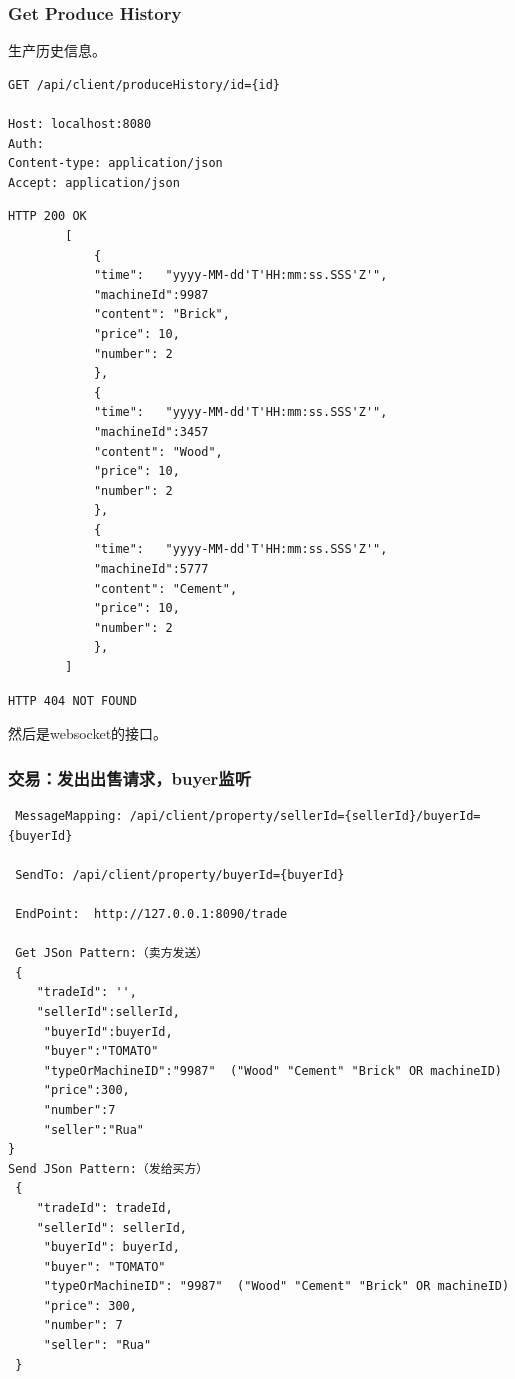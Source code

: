 \documentclass[12pt, a4paper,UTF8]{article}
\begin{document}
				\subsubsection{Get Produce History}
					生产历史信息。
\begin{lstlisting}
GET /api/client/produceHistory/id={id}

Host: localhost:8080
Auth:
Content-type: application/json
Accept: application/json
\end{lstlisting}
\begin{lstlisting}
HTTP 200 OK
        [
            {
            "time":   "yyyy-MM-dd'T'HH:mm:ss.SSS'Z'",
            "machineId":9987
            "content": "Brick",
            "price": 10,
            "number": 2
            },
            {
            "time":   "yyyy-MM-dd'T'HH:mm:ss.SSS'Z'",
            "machineId":3457
            "content": "Wood",
            "price": 10,
            "number": 2
            },
            {
            "time":   "yyyy-MM-dd'T'HH:mm:ss.SSS'Z'",
            "machineId":5777
            "content": "Cement",
            "price": 10,
            "number": 2
            },
        ]\end{lstlisting}
\begin{lstlisting}
HTTP 404 NOT FOUND
\end{lstlisting}

		然后是websocket的接口。

				\subsubsection{交易：发出出售请求，buyer监听}
\begin{lstlisting}
 MessageMapping: /api/client/property/sellerId={sellerId}/buyerId={buyerId}

 SendTo: /api/client/property/buyerId={buyerId}
 
 EndPoint:  http://127.0.0.1:8090/trade

 Get JSon Pattern:（卖方发送）
 {
    "tradeId": '',
    "sellerId":sellerId,
     "buyerId":buyerId,
     "buyer":"TOMATO"
     "typeOrMachineID":"9987"  ("Wood" "Cement" "Brick" OR machineID)
     "price":300,
     "number":7
     "seller":"Rua"
}
Send JSon Pattern:（发给买方）
 {
    "tradeId": tradeId,
    "sellerId": sellerId,
     "buyerId": buyerId,
     "buyer": "TOMATO"
     "typeOrMachineID": "9987"  ("Wood" "Cement" "Brick" OR machineID)
     "price": 300,
     "number": 7
     "seller": "Rua"
 }

\end{lstlisting}
\end{document}
